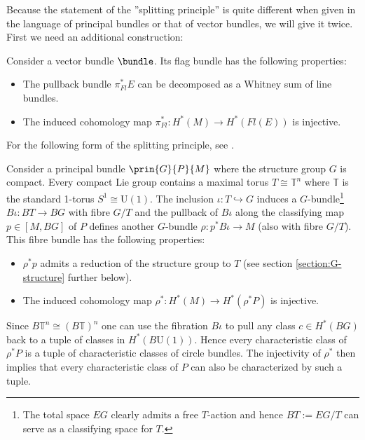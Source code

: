     Because the statement of the ''splitting principle'' is quite different when given in the language of principal bundles or that of vector bundles, we will give it twice. First we need an additional construction:
    \begin{theorem}
        Consider a vector bundle $\bundle$. Its flag bundle has the following properties:
        \begin{itemize}
            \item The pullback bundle $\pi_{Fl}^*E$ can be decomposed as a Whitney sum of line bundles.
            \item The induced cohomology map $\pi_{Fl}^*:H^*(M)\rightarrow H^*(Fl(E))$ is injective.
        \end{itemize}
    \end{theorem}
    For the following form of the splitting principle, see \cite{may_splitting, debray_characteristic}.
    \begin{theorem}
        Consider a principal bundle $\prin{G}{P}{M}$ where the structure group $G$ is compact. Every compact Lie group contains a maximal torus $T\cong\mathbb{T}^n$ where $\mathbb{T}$ is the standard 1-torus $S^1\cong\text{U}(1)$. The inclusion $\iota:T\hookrightarrow G$ induces a $G$-bundle\footnote{The total space $EG$ clearly admits a free $T$-action and hence $BT:=EG/T$ can serve as a classifying space for $T$.} $B\iota:BT\rightarrow BG$ with fibre $G/T$ and the pullback of $B\iota$ along the classifying map $p\in[M, BG]$ of $P$ defines another $G$-bundle $\rho:p^*B\iota\rightarrow M$ (also with fibre $G/T$). This fibre bundle has the following properties:
        \begin{itemize}
            \item $\rho^*p$ admits a reduction of the structure group to $T$ (see section \ref{section:G-structure} further below).
            \item The induced cohomology map $\rho^*:H^*(M)\rightarrow H^*(\rho^*P)$ is injective.
        \end{itemize}
    \end{theorem}
    Since $B\mathbb{T}^n\cong(B\mathbb{T})^n$ one can use the fibration $B\iota$ to pull any class $c\in H^*(BG)$ back to a tuple of classes in $H^*(B\text{U}(1))$. Hence every characteristic class of $\rho^*P$ is a tuple of characteristic classes of circle bundles. The injectivity of $\rho^*$ then implies that every characteristic class of $P$ can also be characterized by such a tuple.

